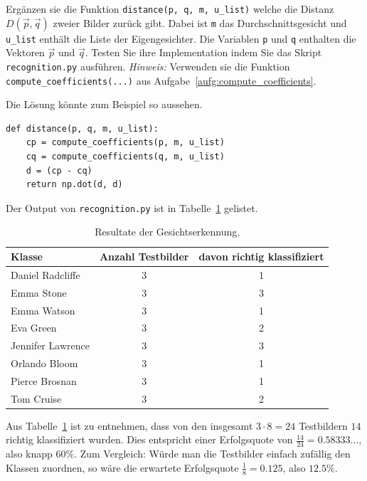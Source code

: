 \begin{aufgabe} \label{aufg:quantification_code}
	Ergänzen sie die Funktion \texttt{distance(p, q, m, u\_list)} welche die Distanz $D\left(\vec p,\vec q\right)$ zweier Bilder zurück gibt.
	Dabei ist \texttt{m} das Durchschnittsgesicht und \texttt{u\_list} enthält die Liste der Eigengesichter.
	Die Variablen \texttt{p} und \texttt{q} enthalten die Vektoren $\vec p$ und $\vec q$.
	Testen Sie ihre Implementation indem Sie das Skript \texttt{recognition.py} ausführen.
	\textit{Hinweis:} Verwenden sie die Funktion \texttt{compute\_coefficients(...)} aus Aufgabe~\ref{aufg:compute_coefficients}.
\end{aufgabe}
\begin{losung*}
	Die Lösung könnte zum Beispiel so aussehen.
\begin{lstlisting}[style=python]
def distance(p, q, m, u_list):
	cp = compute_coefficients(p, m, u_list)
	cq = compute_coefficients(q, m, u_list)
	d = (cp - cq)
	return np.dot(d, d)
\end{lstlisting}
Der Output von \texttt{recognition.py} ist in Tabelle~\ref{tab:recognition} gelistet.
\end{losung*}
\begin{table}[ht]
	\centering
	\begin{tabular}{|l|c|c|}
		\hline
		\textbf{Klasse} & \textbf{Anzahl Testbilder} & \textbf{davon richtig klassifiziert} \\ \hline
		Daniel Radcliffe & 3 & 1 \\ \hline
		Emma Stone & 3 & 3 \\ \hline
		Emma Watson & 3 & 1 \\ \hline
		Eva Green & 3 & 2 \\ \hline
		Jennifer Lawrence & 3 & 3 \\ \hline
		Orlando Bloom & 3 & 1 \\ \hline
		Pierce Brosnan & 3 & 1 \\ \hline
		Tom Cruise & 3 & 2 \\ \hline
	\end{tabular}
	\caption{Resultate der Gesichtserkennung.}
	\label{tab:recognition}
\end{table}
Aus Tabelle~\ref{tab:recognition} ist zu entnehmen, dass von den insgesamt $3\cdot8=24$ Testbildern $14$ richtig klassifiziert wurden.
Dies entspricht einer Erfolgsquote von $\frac{14}{24}=0.58333\ldots$, also knapp $60\%$.
Zum Vergleich: Würde man die Testbilder einfach zufällig den Klassen zuordnen, so wäre die erwartete Erfolgsquote $\frac{1}{8}=0.125$, also $12.5\%$.